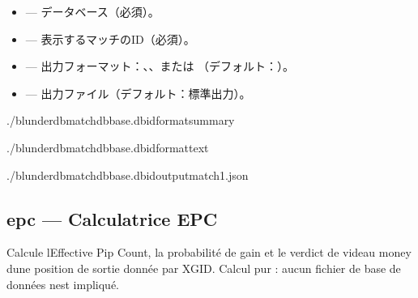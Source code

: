 \documentclass[letterpaper,10pt,dvipdfmx]{sphinxmanual}
\begin{document}
\sphinxAtStartPar
{}
\begin{itemize}
\item {} 
\sphinxAtStartPar
{} — データベース（必須）。

\item {} 
\sphinxAtStartPar
{} — 表示するマッチのID（必須）。

\item {} 
\sphinxAtStartPar
{} — 出力フォーマット：、、または （デフォルト：）。

\item {} 
\sphinxAtStartPar
{} — 出力ファイル（デフォルト：標準出力）。

\end{itemize}

\sphinxAtStartPar
{}

\begin{sphinxVerbatim}[commandchars=\\\{\}]
./blunderdbmatch\PYGZhy{}\PYGZhy{}dbbase.db\PYGZhy{}\PYGZhy{}id\PYGZhy{}\PYGZhy{}formatsummary

./blunderdbmatch\PYGZhy{}\PYGZhy{}dbbase.db\PYGZhy{}\PYGZhy{}id\PYGZhy{}\PYGZhy{}formattext

./blunderdbmatch\PYGZhy{}\PYGZhy{}dbbase.db\PYGZhy{}\PYGZhy{}id\PYGZhy{}\PYGZhy{}outputmatch1.json
\end{sphinxVerbatim}


\subsection{epc — Calculatrice EPC}
\label{\detokenize{cli:epc-calculatrice-epc}}
\sphinxAtStartPar
Calcule l\textquotesingle{}Effective Pip Count, la probabilité de gain et le verdict de videau
money d\textquotesingle{}une position de sortie donnée par XGID. Calcul pur : aucun fichier de
base de données n\textquotesingle{}est impliqué.
\end{document}
